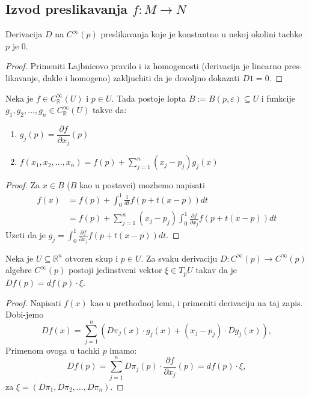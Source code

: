 \documentclass[a4paper,12pt]{article}
\newcommand{\RR}{\mathbb{R}}
\newcommand{\eps}{\varepsilon}
\newcommand{\psj}{\subseteq}
\newcommand{\ds}{\displaystyle}
\begin{document}
\subsection{Izvod preslikavanja $f:M \to N$}

\begin{lema}
	Derivacija $D$ na $C^\infty(p)$ preslikavanja koje je konstantno u nekoj okolini tachke $p$ je 0.
\end{lema}
\begin{proof}
	Primeniti Lajbnicovo pravilo i iz homogenosti (derivacija je linearno pres-likavanje, dakle i homogeno) zakljuchiti
	da je dovoljno dokazati $D1 = 0$.
\end{proof}

\begin{lema}
	Neka je $f \in C^\infty_\RR (U)$ i $p \in U$. Tada postoje lopta $B := B(p, \eps) \psj U$ i funkcije
	$g_1, g_2, \dotso, g_n \in C^\infty_\RR (U)$ takve da:
	\begin{enumerate}
		\item $g_j(p) = \dfrac{\partial f}{\partial x_j}(p)$
		\item $\ds{f(x_1, x_2, \dotso, x_n) = f(p) + \sum_{j=1}^n(x_j - p_j)g_j(x)}$
	\end{enumerate}
\end{lema}
\begin{proof}
	Za $x \in B$ ($B$ kao u postavci) mozhemo napisati
	\begin{align*}
		f(x) &= f(p) + \int_0^1 \frac{1}{dt}f(p+t(x-p))dt\\
			 &= f(p) + \sum_{j=1}^n(x_j - p_j)\int_0^1 \frac{\partial f}{\partial x_j}f(p+t(x-p))dt
	\end{align*}
	Uzeti da je \(\ds{ g_j = \int_0^1 \frac{\partial f}{\partial x_j}f(p+t(x-p))dt }\).
\end{proof}

\begin{tma}
	Neka je $U\psj \RR^n$ otvoren skup i $p\in U$. Za svaku derivaciju $D : C^\infty(p)\to C^\infty(p)$
	algebre $C^\infty(p)$ postoji jedinstveni vektor $\xi \in T_p U$ takav da je $Df(p) = df(p)\cdot \xi$.
\end{tma}
\begin{proof}
	Napisati $f(x)$ kao u prethodnoj lemi, i primeniti derivaciju na taj zapis. Dobi-jemo
	\[ Df(x) = \sum_{j=1}^n(D\pi_j(x)\cdot g_j(x) + (x_j - p_j)\cdot Dg_j(x)) ,\] 
	Primenom ovoga u tachki $p$ imamo:
	\[ Df(p) = \sum_{j=1}^nD\pi_j(p)\cdot \dfrac{\partial f}{\partial x_j}(p) = df(p)\cdot \xi ,\]
	za $\xi = (D\pi_1, D\pi_2, \dotso, D\pi_n)$.
\end{proof}
\end{document}
